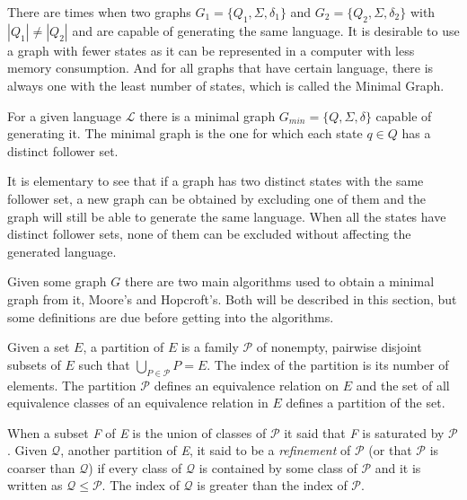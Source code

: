 {There are times when two graphs $G_1 = \{Q_1, \Sigma, \delta_1\}$ and $G_2 = \{Q_2, \Sigma, \delta_2\}$ with $|Q_1|\neq |Q_2|$ and are capable of generating the same language. It is desirable to use a graph with fewer states as it can be represented in a computer with less memory consumption. And for all graphs that have certain language, there is always one with the least number of states, which is called the Minimal Graph. 

\begin{definition}\label{def:mingraph}
For a given language $\mathcal{L}$ there is a minimal graph $G_{min} = \{Q,\Sigma ,\delta \}$ capable of generating it. The minimal graph is the one for which each state $q \in Q$ has a distinct follower set.
\end{definition}

It is elementary to see that if a graph has two distinct states with the same follower set, a new graph can be obtained by excluding one of them and the graph will still be able to generate the same language. When all the states have distinct follower sets, none of them can be excluded without affecting the generated language.

Given some graph $G$ there are two main algorithms used to obtain a minimal graph from it, Moore's and Hopcroft's. Both will be described in this section, but some definitions are due before getting into the algorithms.

\begin{definition}\label{def:partition}
Given a set $E$, a partition of $E$ is a family $\mathcal{P}$ of nonempty, pairwise disjoint subsets of $E$ such that $\bigcup_{P\in\mathcal{P}}P = E $. The index of the partition is its number of elements. The partition $\mathcal{P}$ defines an equivalence relation on $E$ and the set of all equivalence classes of an equivalence relation in $E$ defines a partition of the set.
\end{definition}

When a subset \textit{F} of \textit{E} is the union of classes of $\mathcal{P}$ it said that \textit{F} is saturated by $\mathcal{P}$. Given $\mathcal{Q}$, another partition of \textit{E}, it said to be a \textit{refinement} of $\mathcal{P}$ (or that $\mathcal{P}$ is coarser than $\mathcal{Q}$) if every class of $\mathcal{Q}$ is contained by some class of $\mathcal{P}$ and it is written as $\mathcal{Q} \leq \mathcal{P}$. The index of $\mathcal{Q}$ is greater than the index of $\mathcal{P}$.

}

